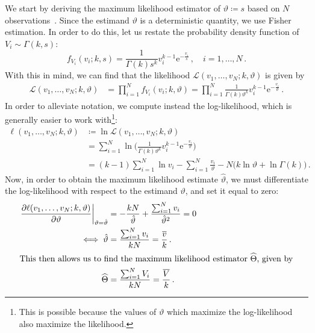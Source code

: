 \documentclass[final]{aomart}
\newtheorem[{}\it]{thm}{Theorem}[section]
\theoremstyle{definition}
\newtheorem*[{}\it]{notation}{Notation}
\numberwithin{equation}{section}
\newcommand{\wh}{\widehat}
\renewcommand{\theta}{\vartheta}
\newcommand{\like}{\mathcal{L}} %
\newcommand{\e}{\mathrm{e}} %
\newcommand{\pdf}{f} %
\newcommand{\htheta}{\hat{\theta}} %
\newcommand{\hTheta}{\wh{\Theta}} %
\newcommand{\eval}[2][\right]{\relax
  \ifx#1\right\relax \left.\fi#2#1\rvert}
\begin{document}
We start by deriving the maximum likelihood estimator of \(\theta \coloneqq s\) based on \(N\) observations~\cite{wiki:mle}.
Since the estimand $\theta$ is a deterministic quantity, we use Fisher estimation.
In order to do this, let us restate the probability density function of \(V_i \sim \Gamma(k, s)\):
\begin{equation}
\pdf_{V_i}(v_i; k, s) = \frac{1}{\Gamma(k) s^k} v_i^{k-1} \e^{-\frac{v_i}{s}}\,, \quad i = 1, \ldots, N\,.\label{eq:gamma}
\end{equation}
With this in mind, we can find that the likelihood \(\like(v_1, \ldots, v_N; k, \theta)\) is given by
\begin{align}
\like(v_1, \ldots, v_N; k, \theta) &= \prod_{i=1}^{N} \pdf_{V_i}(v_i; k,\theta) = \prod_{i=1}^{N} \frac{1}{\Gamma(k) \theta^k} v_i^{k-1} \e^{-\frac{v_i}{\theta}}\,.
\end{align}
In order to alleviate notation, we compute instead the log-likelihood, which is generally easier to work with\footnote{This is possible because the values of \(\theta\) which maximize the log-likelihood also maximize the likelihood.}:
\begin{align}
\ell(v_1, \ldots, v_N; k, \theta) &\coloneqq \ln \like(v_1, \ldots, v_N; k, \theta)\\
&= \sum_{i=1}^{N} \ln\Bigg(\frac{1}{\Gamma(k) \theta^k} v_i^{k-1} \e^{-\frac{v_i}{\theta}}\Bigg)\\
&= (k-1) \sum_{i=1}^{N}\ln v_i - \sum_{i=1}^{N} \frac{v_i}{\theta} - N \big(k \ln \theta + \ln \Gamma(k)\big)\,.\label{eq:loglikelihood}
\end{align}
Now, in order to obtain the maximum likelihood estimate \(\htheta\), we must differentiate the log-likelihood with respect to the estimand \(\theta\), and set it equal to zero:
\begin{align}
\eval{\frac{\partial \ell(v_1, \ldots, v_N; k, \theta)}{\partial \theta}}_{\theta = \htheta} &= -\frac{kN}{\htheta} + \frac{\sum_{i=1}^{N} v_i}{\htheta^2} = 0\\
\iff \htheta &= \frac{\sum_{i=1}^{N} v_i}{kN} = \frac{\widebar{v}}{k}\,.\\
\intertext{This then allows us to find the maximum likelihood estimator \(\hTheta\), given by}
\hTheta &= \frac{\sum_{i=1}^{N} V_i}{kN} = \frac{\widebar{V}}{k}\,.\label{eq:mlestimator}
\end{align}
\end{document}
